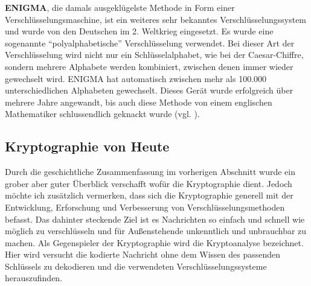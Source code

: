 \documentclass[german,12pt,a4paper]{article}
\begin{document}
\textbf{ENIGMA}, die damals ausgeklügelste Methode in Form einer Verschlüsselungsmaschine, ist ein weiteres sehr bekanntes Verschlüsselungssystem und wurde von den Deutschen im 2. Weltkrieg eingesetzt. Es wurde eine sogenannte “polyalphabetische” Verschlüsselung verwendet. Bei dieser Art der Verschlüsselung wird nicht nur ein Schlüsselalphabet, wie bei der Caesar-Chiffre, sondern mehrere Alphabete werden kombiniert, zwischen denen immer wieder gewechselt wird. ENIGMA hat automatisch zwischen mehr als 100.000 unterschiedlichen Alphabeten gewechselt. Dieses Gerät wurde erfolgreich über mehrere Jahre angewandt, bis auch diese Methode von einem englischen Mathematiker schlussendlich geknackt wurde (vgl. \cite[103--105]{RempeGillen2009}).

\subsection{Kryptographie von Heute}
Durch die geschichtliche Zusammenfassung im vorherigen Abschnitt wurde ein grober aber guter Überblick verschafft wofür die Kryptographie dient. Jedoch möchte ich zusätzlich vermerken, dass sich die Kryptographie generell mit der Entwicklung, Erforschung und Verbesserung von Verschlüsselungsmethoden befasst. Das dahinter steckende Ziel ist es Nachrichten so einfach und schnell wie möglich zu verschlüsseln und für Außenstehende unkenntlich und unbrauchbar zu machen. Als Gegenspieler der Kryptographie wird die Kryptoanalyse bezeichnet. Hier wird versucht die kodierte Nachricht ohne dem Wissen des passenden Schlüssels zu dekodieren und die verwendeten Verschlüsselungssysteme herauszufinden.\\
\end{document}
